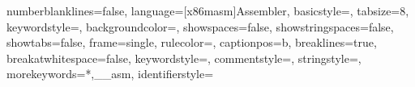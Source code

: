 {
    numberblanklines=false,
    language=[x86masm]Assembler,
    basicstyle=\ttfamily\footnotesize,
    tabsize=8,
    keywordstyle=\color{red},
    backgroundcolor=\color{lightlightgray}, %
    showspaces=false,
    showstringspaces=false,
    showtabs=false,
    frame=single,                   %
    rulecolor=\color{black},
    captionpos=b,                   %
    breaklines=true,                %
    breakatwhitespace=false,        %
    keywordstyle=\color{blue},      %
    commentstyle=\color{dkgreen},   %
    stringstyle=\color{mauve},      %
    morekeywords={*,__asm},         %
    identifierstyle= %
}


